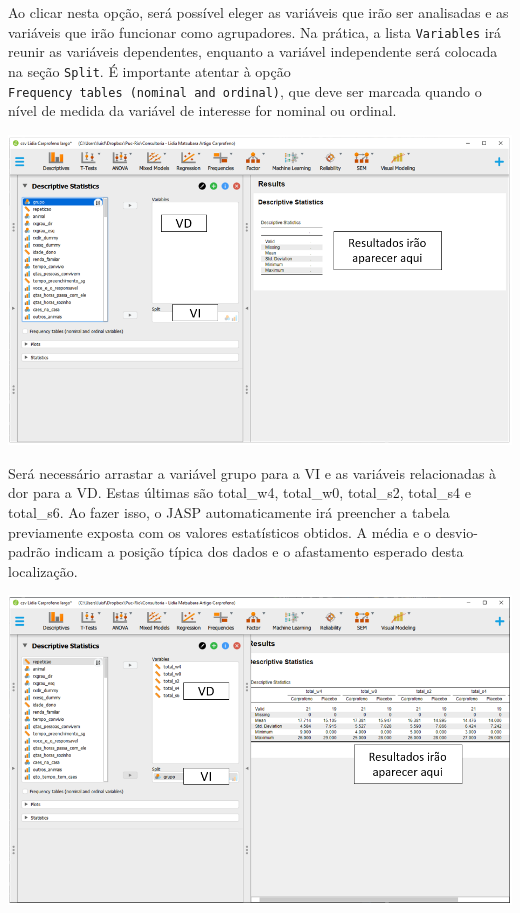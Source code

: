 \documentclass[
]{book}
\begin{document}
Ao clicar nesta opção, será possível eleger as variáveis que irão ser analisadas e as variáveis que irão funcionar como agrupadores. Na prática, a lista \texttt{Variables} irá reunir as variáveis dependentes, enquanto a variável independente será colocada na seção \texttt{Split}. É importante atentar à opção \texttt{Frequency\ tables\ (nominal\ and\ ordinal)}, que deve ser marcada quando o nível de medida da variável de interesse for nominal ou ordinal.

\includegraphics{./img/cap_anovarm_descriptives2.png}

Será necessário arrastar a variável grupo para a VI e as variáveis relacionadas à dor para a VD. Estas últimas são total\_w4, total\_w0, total\_s2, total\_s4 e total\_s6. Ao fazer isso, o JASP automaticamente irá preencher a tabela previamente exposta com os valores estatísticos obtidos. A média e o desvio-padrão indicam a posição típica dos dados e o afastamento esperado desta localização.

\includegraphics{./img/cap_anovarm_descriptives3.png}
\end{document}
